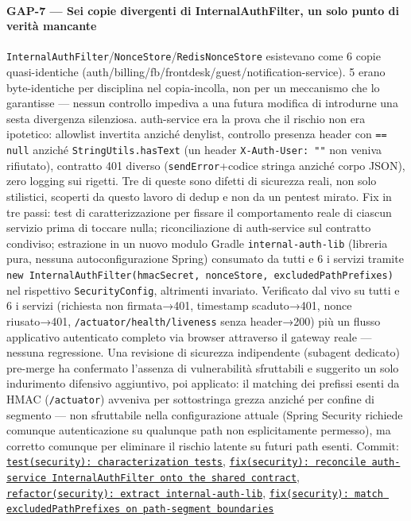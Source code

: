 ﻿\documentclass[a4paper,12pt]{report}
\newcommand{\commitref}[2]{\texttt{\small \href{https://github.com/diegoandruccioli/hotel-pms/commit/#1}{#2}}}
\begin{document}
\paragraph{GAP-7 --- Sei copie divergenti di InternalAuthFilter, un solo punto di verità mancante}
\texttt{InternalAuthFilter}/\texttt{NonceStore}/\texttt{RedisNonceStore} esistevano
come 6 copie quasi-identiche (auth/billing/fb/frontdesk/guest/notification-service).
5 erano byte-identiche per disciplina nel copia-incolla, non per un meccanismo che
lo garantisse --- nessun controllo impediva a una futura modifica di introdurne una
sesta divergenza silenziosa. auth-service era la prova che il rischio non era
ipotetico: allowlist invertita anziché denylist, controllo presenza header con
\texttt{== null} anziché \texttt{StringUtils.hasText} (un header
\texttt{X-Auth-User: ""} non veniva rifiutato), contratto 401 diverso
(\texttt{sendError}+codice stringa anziché corpo JSON), zero logging sui rigetti.
Tre di queste sono difetti di sicurezza reali, non solo stilistici, scoperti da
questo lavoro di dedup e non da un pentest mirato. Fix in tre passi: test di
caratterizzazione per fissare il comportamento reale di ciascun servizio prima di
toccare nulla; riconciliazione di auth-service sul contratto condiviso; estrazione
in un nuovo modulo Gradle \texttt{internal-auth-lib} (libreria pura, nessuna
autoconfigurazione Spring) consumato da tutti e 6 i servizi tramite
\texttt{new InternalAuthFilter(hmacSecret, nonceStore, excludedPathPrefixes)} nel
rispettivo \texttt{SecurityConfig}, altrimenti invariato. Verificato dal vivo su
tutti e 6 i servizi (richiesta non firmata→401, timestamp scaduto→401, nonce
riusato→401, \texttt{/actuator/health/liveness} senza header→200) più un flusso
applicativo autenticato completo via browser attraverso il gateway reale --- nessuna
regressione. Una revisione di sicurezza indipendente (subagent dedicato) pre-merge
ha confermato l'assenza di vulnerabilità sfruttabili e suggerito un solo indurimento
difensivo aggiuntivo, poi applicato: il matching dei prefissi esenti da HMAC
(\texttt{/actuator}) avveniva per sottostringa grezza anziché per confine di
segmento --- non sfruttabile nella configurazione attuale (Spring Security
richiede comunque autenticazione su qualunque path non esplicitamente permesso),
ma corretto comunque per eliminare il rischio latente su futuri path esenti.
Commit: \commitref{5d13a7d}{test(security): characterization tests}, \commitref{8607d7c}{fix(security): reconcile auth-service InternalAuthFilter onto the shared contract}, \commitref{9cec99f}{refactor(security): extract internal-auth-lib}, \commitref{59d5bf5}{fix(security): match excludedPathPrefixes on path-segment boundaries}
\end{document}
